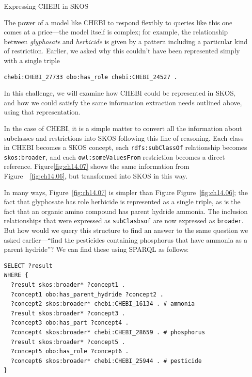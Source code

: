 \begin{challenge}{Expressing CHEBI in SKOS}
\label{chal:39}

The power of a model like CHEBI to respond flexibly to queries like this
one comes at a price---the model itself is complex; for example, the
relationship between \textit{glyphosate} and \textit{herbicide} is given by a pattern
including a particular kind of restriction. Earlier, we asked why this
couldn't have been represented simply with a single triple

\begin{lstlisting}
chebi:CHEBI_27733 obo:has_role chebi:CHEBI_24527 .
\end{lstlisting}

In this challenge, we will examine how CHEBI could be represented in
SKOS, and how we could satisfy the same information extraction needs
outlined above, using that representation.

In the case of CHEBI, it is a simple matter to convert all the
information about subclasses and restrictions into SKOS following this
line of reasoning. Each class in CHEBI becomes a SKOS concept, each
\texttt{rdfs:subClassOf} relationship becomes \texttt{skos:broader}, and each
\texttt{owl:someValuesFrom} restriction becomes a direct reference. Figure\ref{fig:ch14.07}
shows the same information from Figure~~\ref{fig:ch14.06}, but transformed into SKOS
in this way.

In many ways, Figure~\ref{fig:ch14.07} is simpler than Figure Figure~\ref{fig:ch14.06}; the fact that
glyphosate has role herbicide is represented as a single triple, as is
the fact that an organic amino compound has parent hydride ammonia. The
inclusion relationships that were expressed as \texttt{subClasbsof} are now
expressed as \texttt{broader}. But how would we query this structure to find an
answer to the same question we asked earlier---``find the pesticides
containing phosphorus that have ammonia as a parent hydride''? We can
find these using SPARQL as follows:

\begin{lstlisting}
SELECT ?result
WHERE {
  ?result skos:broader* ?concept1 .
  ?concept1 obo:has_parent_hydride ?concept2 .
  ?concept2 skos:broader* chebi:CHEBI_16134 . # ammonia
  ?result skos:broader* ?concept3 .
  ?concept3 obo:has_part ?concept4 .
  ?concept4 skos:broader* chebi:CHEBI_28659 . # phosphorus
  ?result skos:broader* ?concept5 .
  ?concept5 obo:has_role ?concept6 .
  ?concept6 skos:broader* chebi:CHEBI_25944 . # pesticide
}
\end{lstlisting}


\end{challenge}
